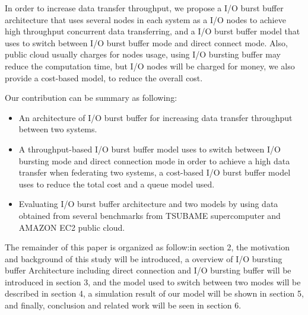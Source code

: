 In order to increase data transfer throughput, we propose a I/O burst buffer architecture that uses several nodes in each system as a I/O nodes to achieve high throughput concurrent data transferring, and a I/O burst buffer model that uses to switch between I/O burst buffer mode and direct connect mode.
Also, public cloud usually charges for nodes usage, using I/O bursting buffer may reduce the computation time, but I/O nodes will be charged for money, we also provide a cost-based model, to reduce the overall cost.

Our contribution can be summary as following:
\begin{itemize}
	\item An architecture of I/O burst buffer for increasing data transfer throughput between two systems.
	\item A throughput-based I/O burst buffer model uses to switch between I/O bursting mode and direct connection mode in order to achieve a high data transfer when federating two systems, a cost-based I/O burst buffer model uses to reduce the total cost and a queue model used.
	\item Evaluating I/O burst buffer architecture and two models by using data obtained from several benchmarks from TSUBAME supercomputer and AMAZON EC2 public cloud.
\end{itemize}
The remainder of this paper is organized as follow:in section 2, the motivation and background of this study will be introduced, a overview of I/O bursting buffer Architecture including direct connection and I/O bursting buffer will be introduced in section 3, and the model used to switch between two modes will be described in section 4, a simulation result of our model %
will be shown in section 5, and finally, conclusion and related work will be seen in section 6.